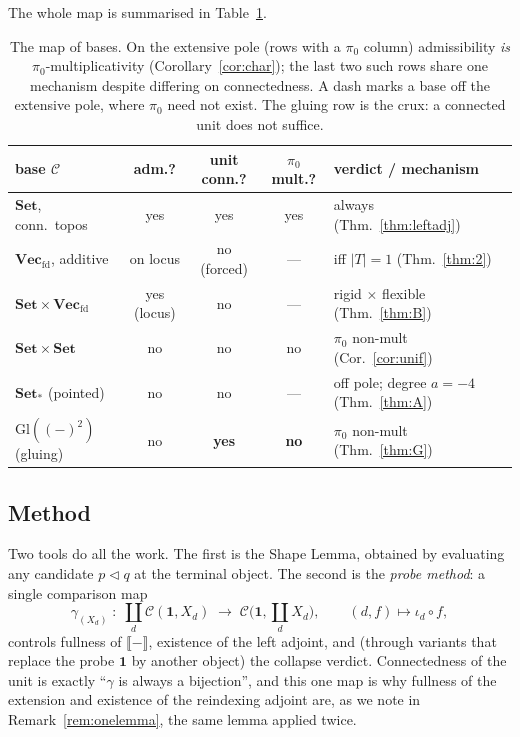 \documentclass[11pt]{amsart}
\theoremstyle{plain}
\theoremstyle{definition}
\newcommand{\C}{\mathcal{C}}
\newcommand{\ext}[1]{\llbracket #1 \rrbracket}
\newcommand{\Setb}{\mathbf{Set}}
\newcommand{\Vecfd}{\mathbf{Vec}_{\mathrm{fd}}}
\newcommand{\Gl}{\mathrm{Gl}}
\newcommand{\comp}{\mathbin{\triangleleft}}
\newcommand{\one}{\mathbf{1}}
\newcommand{\pizero}{\pi_0}
\begin{document}
The whole map is summarised in Table~\ref{tab:map}.

\begin{table}[h]
\renewcommand{\arraystretch}{1.25}
\setlength{\tabcolsep}{4pt}
{\footnotesize
\begin{tabular}{@{}lcccl@{}}
\toprule
base $\C$ & adm.? & unit conn.? & $\pizero$ mult.? & verdict / mechanism \\
\midrule
$\Setb$, conn.\ topos & yes & yes & yes & always (Thm.~\ref{thm:leftadj})\\
$\Vecfd$, additive & on locus & no (forced) & --- & iff $|T|=1$ (Thm.~\ref{thm:2})\\
$\Setb\times\Vecfd$ & yes (locus) & no & --- & rigid $\times$ flexible (Thm.~\ref{thm:B})\\
$\Setb\times\Setb$ & no & no & no & $\pizero$ non-mult (Cor.~\ref{cor:unif})\\
$\Setb_*$ (pointed) & no & no & --- & off pole; degree $a=-4$ (Thm.~\ref{thm:A})\\
$\Gl((-)^2)$ (gluing) & no & \textbf{yes} & \textbf{no} & $\pizero$ non-mult (Thm.~\ref{thm:G})\\
\bottomrule
\end{tabular}
}
\medskip
\caption{The map of bases. On the extensive pole (rows with a $\pizero$ column) admissibility
\emph{is} $\pizero$-multiplicativity (Corollary~\ref{cor:char}); the last two such rows share one
mechanism despite differing on connectedness. A dash marks a base off the extensive pole, where
$\pizero$ need not exist. The gluing row is the crux: a connected unit does not suffice.}
\label{tab:map}
\end{table}

\subsection*{Method}
Two tools do all the work. The first is the Shape Lemma, obtained by evaluating any candidate
$p\comp q$ at the terminal object. The second is the \emph{probe method}: a single comparison map
\[
   \gamma_{(X_d)}\;:\;\coprod_{d}\C(\one,X_d)\;\longrightarrow\;\C\!\Big(\one,\coprod_d X_d\Big),
   \qquad (d,f)\mapsto \iota_d\circ f,
\]
controls fullness of $\ext{-}$, existence of the left adjoint, and (through variants that replace the
probe $\one$ by another object) the collapse verdict. Connectedness of the unit is exactly
``$\gamma$ is always a bijection'', and this one map is why fullness of the extension and existence of
the reindexing adjoint are, as we note in Remark~\ref{rem:onelemma}, the same lemma applied twice.
\end{document}
